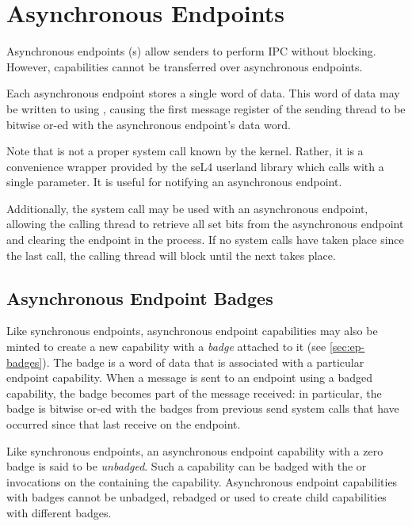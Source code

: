 \section{Asynchronous Endpoints}

Asynchronous endpoints (s)
allow senders to perform IPC without blocking.
However, capabilities cannot be transferred over asynchronous endpoints.

Each asynchronous endpoint stores a single word of data. This word of
data may be written to using , causing the
first message register of the sending thread to be bitwise or-ed with
the asynchronous endpoint's data word.

Note that  is not a proper system call
known by the kernel. Rather, it is a convenience
wrapper provided by the seL4 userland library which calls
 with a single parameter. It is
useful for notifying an asynchronous endpoint.

Additionally, the  system call may be used with an
asynchronous endpoint, allowing the calling thread to retrieve all set
bits from the asynchronous endpoint and clearing the endpoint in the
process. If no  system calls have taken place since the last
 call, the calling thread will block until the next
 takes place.

\subsection{Asynchronous Endpoint Badges}

Like synchronous endpoints, asynchronous endpoint capabilities may also
be minted to create a new capability with a \emph{badge} attached to it (see \autoref{sec:ep-badges}).
The badge is a word of data that is associated with a particular
endpoint capability. When a message is sent to an endpoint using
a badged capability, the badge becomes part of the message received: in
particular, the badge is bitwise or-ed with the badges from
previous send system calls that have occurred since that last receive
on the endpoint.

Like synchronous endpoints, an asynchronous endpoint capability with
a zero badge is said to be \emph{unbadged}. Such a capability can be
badged with the  or  invocations on the
 containing the capability. Asynchronous endpoint
capabilities with badges cannot be unbadged, rebadged or used to create
child capabilities with different badges.

